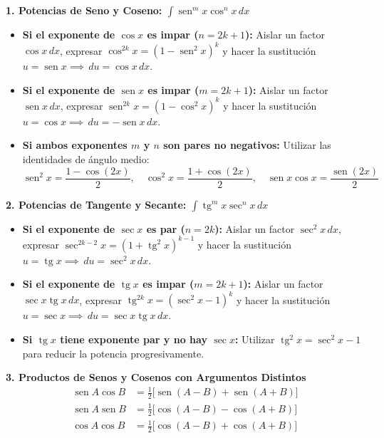 \documentclass[12pt, letterpaper]{article}
\newcommand{\dx}{\,dx}
\newcommand{\du}{\,du}
\DeclareMathOperator{\sen}{sen}
\DeclareMathOperator{\tg}{tg}
\begin{document}
\begin{cuadroteoria}
\noindent\textbf{1. Potencias de Seno y Coseno: $\int \sen^m x \cos^n x \dx$}
\begin{itemize}[leftmargin=*]
  \item \textbf{Si el exponente de $\cos x$ es impar ($n = 2k+1$):} Aislar un factor $\cos x \dx$, expresar $\cos^{2k} x = (1 - \sen^2 x)^k$ y hacer la sustitución $u = \sen x \implies \du = \cos x \dx$.
  \item \textbf{Si el exponente de $\sen x$ es impar ($m = 2k+1$):} Aislar un factor $\sen x \dx$, expresar $\sen^{2k} x = (1 - \cos^2 x)^k$ y hacer la sustitución $u = \cos x \implies \du = -\sen x \dx$.
  \item \textbf{Si ambos exponentes $m$ y $n$ son pares no negativos:} Utilizar las identidades de ángulo medio:
    $$\sen^2 x = \frac{1 - \cos(2x)}{2}, \quad \cos^2 x = \frac{1 + \cos(2x)}{2}, \quad \sen x \cos x = \frac{\sen(2x)}{2}$$
\end{itemize}
\end{cuadroteoria}
\newpage

\begin{cuadrosolucion}
\noindent\textbf{2. Potencias de Tangente y Secante: $\int \tg^m x \sec^n x \dx$}
\begin{itemize}[leftmargin=*]
  \item \textbf{Si el exponente de $\sec x$ es par ($n = 2k$):} Aislar un factor $\sec^2 x \dx$, expresar $\sec^{2k-2} x = (1 + \tg^2 x)^{k-1}$ y hacer la sustitución $u = \tg x \implies \du = \sec^2 x \dx$.
  \item \textbf{Si el exponente de $\tg x$ es impar ($m = 2k+1$):} Aislar un factor $\sec x \tg x \dx$, expresar $\tg^{2k} x = (\sec^2 x - 1)^k$ y hacer la sustitución $u = \sec x \implies \du = \sec x \tg x \dx$.
  \item \textbf{Si $\tg x$ tiene exponente par y no hay $\sec x$:} Utilizar $\tg^2 x = \sec^2 x - 1$ para reducir la potencia progresivamente.
\end{itemize}
\end{cuadrosolucion}

\begin{cuadroadvertencia}
\noindent\textbf{3. Productos de Senos y Cosenos con Argumentos Distintos}
\begin{align*}
  \sen A \cos B &= \frac{1}{2} \big[ \sen(A-B) + \sen(A+B) \big] \\
  \sen A \sen B &= \frac{1}{2} \big[ \cos(A-B) - \cos(A+B) \big] \\
  \cos A \cos B &= \frac{1}{2} \big[ \cos(A-B) + \cos(A+B) \big]
\end{align*}
\end{cuadroadvertencia}
\end{document}
